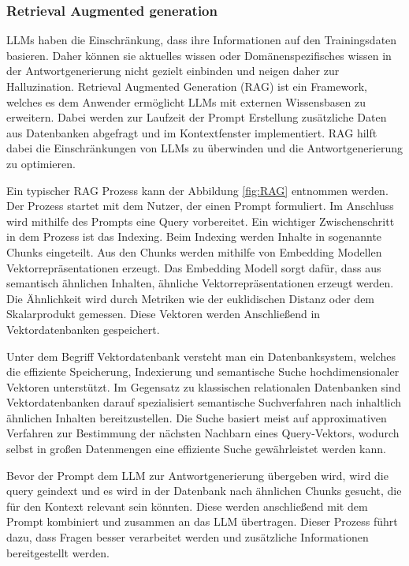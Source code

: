 \subsubsection{Retrieval Augmented generation}
LLMs haben die Einschränkung, dass ihre Informationen auf den Trainingsdaten basieren. Daher können sie aktuelles wissen oder Domänenspezifisches wissen in der Antwortgenerierung nicht gezielt einbinden und neigen daher zur Halluzination. Retrieval Augmented Generation (RAG) ist ein Framework, welches es dem Anwender ermöglicht LLMs mit externen Wissensbasen zu erweitern. Dabei werden zur Laufzeit der Prompt Erstellung zusätzliche Daten aus Datenbanken abgefragt und im Kontextfenster implementiert. RAG hilft dabei die Einschränkungen von LLMs zu überwinden und die Antwortgenerierung zu optimieren.

Ein typischer RAG Prozess kann der Abbildung \ref{fig:RAG} entnommen werden. Der Prozess startet mit dem Nutzer, der einen Prompt formuliert. Im Anschluss wird mithilfe des Prompts eine Query vorbereitet. Ein wichtiger Zwischenschritt in dem Prozess ist das Indexing. Beim Indexing werden Inhalte in sogenannte Chunks eingeteilt. Aus den Chunks werden mithilfe von Embedding Modellen Vektorrepräsentationen erzeugt. Das Embedding Modell sorgt dafür, dass aus semantisch ähnlichen Inhalten, ähnliche Vektorrepräsentationen erzeugt werden. Die Ähnlichkeit wird durch Metriken wie der euklidischen Distanz oder dem Skalarprodukt gemessen. Diese Vektoren werden Anschließend in Vektordatenbanken gespeichert.

Unter dem Begriff Vektordatenbank versteht man ein Datenbanksystem, welches die effiziente Speicherung, Indexierung und semantische Suche hochdimensionaler Vektoren unterstützt. Im Gegensatz zu klassischen relationalen Datenbanken sind Vektordatenbanken darauf spezialisiert semantische Suchverfahren nach inhaltlich ähnlichen Inhalten bereitzustellen. Die Suche basiert meist auf approximativen Verfahren zur Bestimmung der nächsten Nachbarn eines Query-Vektors, wodurch selbst in großen Datenmengen eine effiziente Suche gewährleistet werden kann. 

Bevor der Prompt dem LLM zur Antwortgenerierung übergeben wird, wird die query geindext und es wird in der Datenbank nach ähnlichen Chunks gesucht, die für den Kontext relevant sein könnten. Diese werden anschließend mit dem Prompt kombiniert und zusammen an das LLM übertragen. Dieser Prozess führt dazu, dass Fragen besser verarbeitet werden und zusätzliche Informationen bereitgestellt werden.

